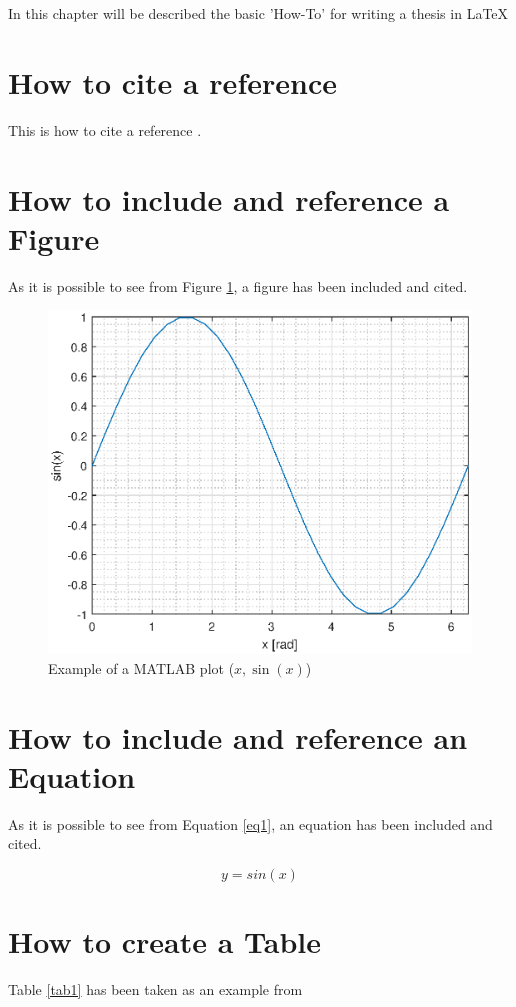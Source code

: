 In this chapter will be described the basic 'How-To' for writing a thesis in \LaTeX

\section{How to cite a reference} 
This is how to cite a reference \cite{Dijkstra68Letters}.

\section{How to include and reference a Figure}
As it is possible to see from Figure \ref{fig1}, a figure has been included and cited.

\begin{figure}[htbp]
\centering
\includegraphics[width = \textwidth]{chapters/chapter-1/figures/sin_figure.eps}
\caption{Example of a MATLAB plot ($x, \sin(x)$)}
\label{fig1}
\end{figure}

\section{How to include and reference an Equation}
As it is possible to see from Equation \eqref{eq1}, an equation has been included and cited.

\begin{equation}
y = sin(x)
\label{eq1}
\end{equation}

\section{How to create a Table}
Table \ref{tab1} has been taken as an example from \citep{latexTables}

